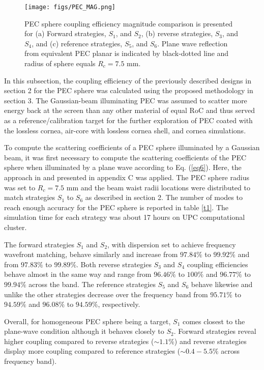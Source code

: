 \documentclass{osa-article}
\begin{document}
\begin{figure}[t]
\centering
\texttt{[image: figs/PEC\_MAG.png]}
\caption{ PEC sphere coupling efficiency magnitude comparison is presented for (a) Forward strategies, $S_1$, and $S_2$, (b) reverse strategies, $S_3$, and $S_4$, and (c) reference strategies, $S_5$, and $S_6$. Plane wave reflection from equivalent PEC planar is indicated by black-dotted line and radius of sphere equals $R_c=7.5$ mm.}
\end{figure}
In this subsection, the coupling efficiency of the previously described designs in section 2 for the PEC sphere was calculated using the proposed methodology in section 3. The Gaussian-beam illuminating PEC was assumed to scatter more energy back at the screen than any other material of equal RoC and thus served as a reference/calibration target for the further exploration of PEC coated with the lossless cornea, air-core with lossless cornea shell, and cornea simulations.

To compute the scattering coefficients of a PEC sphere illuminated by a Gaussian beam, it was first necessary to compute the scattering coefficients of the PEC sphere when illuminated by a plane wave according to Eq. (\ref{eq6}). Here, the approach in \cite{pec} and presented in appendix C was applied. The PEC sphere radius was set to $R_c=7.5$ mm and the beam waist radii locations were distributed to match strategies $S_1$ to $S_6$ as described in section 2. The number of modes to reach enough accuracy for the PEC sphere is reported in table \ref{t1}. The simulation time for each strategy was about 17 hours on UPC computational cluster.

 The forward strategies $S_1$ and $S_2$, with dispersion set to achieve frequency wavefront matching, behave similarly and increase from $97.84 \%$ to $99.92 \%$ and from $97.83 \%$ to $99.89 \%$. Both reverse strategies $S_3$ and $S_4$ coupling efficiencies behave almost in the same way and range from $96.46 \%$ to $100 \%$ and $96.77 \%$ to $99.94 \%$ across the band. The reference strategies $S_5$ and $S_6$ behave likewise and unlike the other strategies decrease over the frequency band from $95.71 \%$ to $94.59 \%$ and $96.08 \%$ to $94.59 \%$, respectively.
 
Overall, for homogeneous PEC sphere being a target, $S_1$ comes closest to the plane-wave condition although it behaves closely to $S_2$. Forward strategies reveal higher coupling compared to reverse strategies ($\sim 1.1 \%$) and reverse strategies display more coupling compared to reference strategies ($\sim 0.4-5.5 \%$ across frequency band). 
\end{document}
